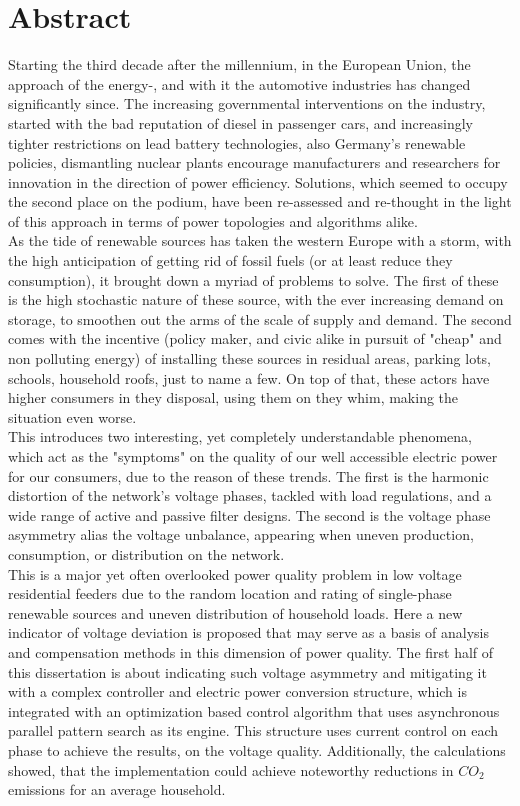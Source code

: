 \chapter*{Abstract}
\thispagestyle{plain}

Starting the third decade after the millennium, in the European Union, the approach of the energy-, and with it the automotive industries has changed significantly since. The increasing governmental interventions on the industry, started with the bad reputation of diesel in passenger cars, and increasingly tighter restrictions on lead battery technologies, also Germany's renewable policies, dismantling nuclear plants encourage manufacturers and researchers for innovation in the direction of power efficiency. Solutions, which seemed to occupy the second place on the podium, have been re-assessed and re-thought in the light of this approach in terms of power topologies and algorithms alike.\\
As the tide of renewable sources has taken the western Europe with a storm, with the high anticipation of getting rid of fossil fuels (or at least reduce they consumption), it brought down a myriad of problems to solve. The first of these is the high stochastic nature of these source, with the ever increasing demand on storage, to smoothen out the arms of the scale of supply and demand. The second comes with the incentive (policy maker, and civic alike in pursuit of "cheap" and non polluting energy) of installing these sources in residual areas, parking lots, schools, household roofs, just to name a few. On top of that, these actors have higher consumers in they disposal, using them on they whim, making the situation even worse.\\
This introduces two interesting, yet completely understandable phenomena, which act as the "symptoms" on the quality of our well accessible electric power for our consumers, due to the reason of these trends. The first is the harmonic distortion of the network's voltage phases, tackled with load regulations, and a wide range of active and passive filter designs. The second is the voltage phase asymmetry alias the voltage unbalance, appearing when uneven production, consumption, or distribution on the network.\\
This is a major yet often overlooked power quality problem in low voltage residential feeders due to the random location and rating of single-phase renewable sources and uneven distribution of household loads. Here a new indicator of voltage deviation is proposed that may serve as a basis of analysis and compensation methods in this dimension of power quality. The first half of this dissertation is about indicating such voltage asymmetry and mitigating it with a complex controller and electric power conversion structure, which is integrated with an optimization based control algorithm that uses asynchronous parallel pattern search as its engine. This structure uses current control on each phase to achieve the results, on the voltage quality. Additionally, the calculations showed, that the implementation could achieve noteworthy reductions in $CO_2$ emissions for an average household. \\
